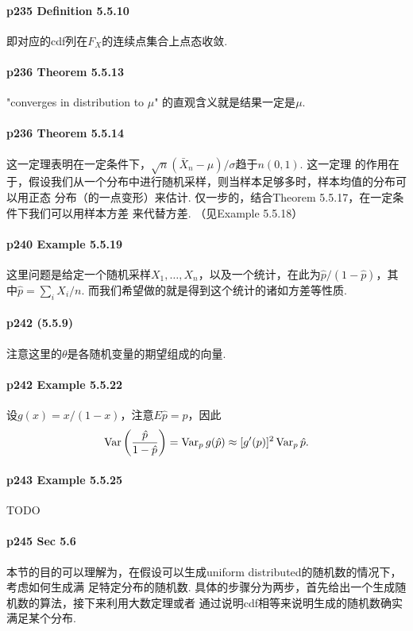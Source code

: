   \paragraph{p235 Definition 5.5.10}
    即对应的cdf列在$F_X$的连续点集合上点态收敛. 

  \paragraph{p236 Theorem 5.5.13}
    "converges in distribution to $\mu$" 的直观含义就是结果一定是$\mu$. 

  \paragraph{p236 Theorem 5.5.14}
    这一定理表明在一定条件下，$\sqrt{n}(\bar{X}_n-\mu)/\sigma$趋于$n(0, 1)$. 这一定理
    的作用在于，假设我们从一个分布中进行随机采样，则当样本足够多时，样本均值的分布可以用正态
    分布（的一点变形）来估计. 仅一步的，结合Theorem 5.5.17，在一定条件下我们可以用样本方差
    来代替方差. （见Example 5.5.18）

  \paragraph{p240 Example 5.5.19}
    这里问题是给定一个随机采样$X_1,\dots,X_n$，以及一个统计，在此为$\hat{p}/(1-\hat{p})
    $，其中$\hat{p}=\sum_i X_i/n$. 而我们希望做的就是得到这个统计的诸如方差等性质. 

  \paragraph{p242 (5.5.9)}
    注意这里的$\theta$是各随机变量的期望组成的向量.

  \paragraph{p242 Example 5.5.22}
    设$g(x)=x/(1-x)$，注意$E\hat{p} = p$，因此
    \[
      \operatorname{Var}\left(\frac{\hat{p}}{1-\hat{p}}\right) =
      \operatorname{Var}_p g(\hat{p}) \approx
      [g^\prime(p)]^2\operatorname{Var}_p\hat{p}.
    \]

  \paragraph{p243 Example 5.5.25}
    TODO

  \paragraph{p245 Sec 5.6}
    本节的目的可以理解为，在假设可以生成uniform distributed的随机数的情况下，考虑如何生成满
    足特定分布的随机数. 具体的步骤分为两步，首先给出一个生成随机数的算法，接下来利用大数定理或者
    通过说明cdf相等来说明生成的随机数确实满足某个分布. 


